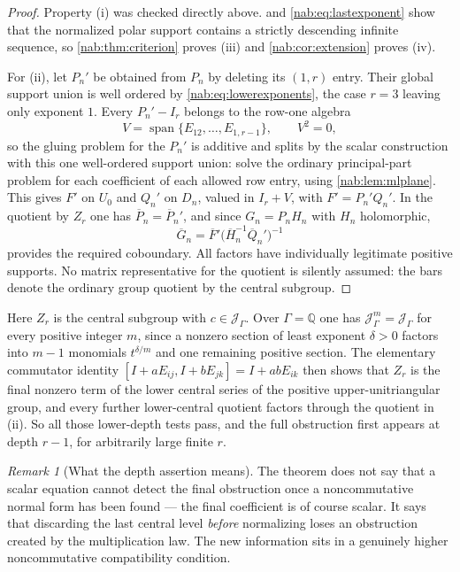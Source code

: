 \documentclass[11pt,letterpaper]{article}
\theoremstyle{definition}
\theoremstyle{remark}
\newtheorem{remark}[remark]{Remark}
\newcommand{\Q}{\mathbb Q}
\newcommand{\JJ}{\mathscr J_\Gamma}
\numberwithin{equation}{section}
\begin{document}
\begin{proof}
Property (i) was checked directly above.  and
\eqref{nab:eq:lastexponent} show that the normalized polar support contains a
strictly descending infinite sequence, so \cref{nab:thm:criterion} proves
(iii) and \cref{nab:cor:extension} proves (iv).

For (ii), let $P_n'$ be obtained from $P_n$ by deleting its $(1,r)$ entry.
Their global support union is well ordered by
\eqref{nab:eq:lowerexponents}, the case $r=3$ leaving only exponent $1$. Every
$P_n'-I_r$ belongs to the row-one algebra
\[
 V=\operatorname{span}\{E_{12},\ldots,E_{1,r-1}\},\qquad V^2=0,
\]
so the gluing problem for the $P_n'$ is additive and splits by the scalar
construction with this one well-ordered support union: solve the ordinary
principal-part problem for each coefficient of each allowed row entry, using
\cref{nab:lem:mlplane}. This gives $F'$ on $U_0$ and $Q_n'$ on $D_n$, valued
in $I_r+V$, with $F'=P_n'Q_n'$. In the quotient by $Z_r$ one has
$\overline P_n=\overline P_n'$, and since $G_n=P_nH_n$ with $H_n$ holomorphic,
\[
 \overline G_n=\overline F'\bigl(\overline H_n^{-1}\overline Q_n'\bigr)^{-1}
\]
provides the required coboundary. All factors have individually legitimate
positive supports. No matrix representative for the quotient is silently
assumed: the bars denote the ordinary group quotient by the central subgroup.
\end{proof}

Here $Z_r$ is the central subgroup with $c\in\JJ$. Over $\Gamma=\Q$ one has
$\JJ^m=\JJ$ for every positive integer $m$, since a nonzero section of least
exponent $\delta>0$ factors into $m-1$ monomials $t^{\delta/m}$ and one
remaining positive section. The elementary commutator identity
$[I+aE_{ij},I+bE_{jk}]=I+abE_{ik}$ then shows that $Z_r$ is the final nonzero
term of the lower central series of the positive upper-unitriangular group, and
every further lower-central quotient factors through the quotient in (ii). So
all those lower-depth tests pass, and the full obstruction first appears at
depth $r-1$, for arbitrarily large finite $r$.

\begin{remark}[What the depth assertion means]\label{nab:rem:depth}
The theorem does not say that a scalar equation cannot detect the final
obstruction once a noncommutative normal form has been found --- the final
coefficient is of course scalar. It says that discarding the last central
level \emph{before} normalizing loses an obstruction created by the
multiplication law. The new information sits in a genuinely higher
noncommutative compatibility condition.
\end{remark}
\end{document}

